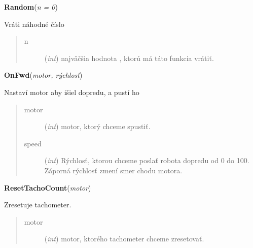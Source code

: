 \documentclass[10pt,a4paper]{article}
\begin{document}
 

\vspace{6pt}
{\bf Random}({\it n = 0}) 
    
    Vráti náhodné číslo
    

    

\begin{quote}
    \begin{description}
        
\item[n] ({\emph{int}}) najväčšia hodnota , ktorú má táto funkcia vrátiť. 

    \end{description}
\end{quote}

 

\vspace{6pt}
{\bf OnFwd}({\it motor, rýchlosť}) 
  
    Nastaví motor aby išiel dopredu, a pustí ho
    


    

\begin{quote}
    \begin{description}
        
\item[motor] ({\emph{int}}) motor, ktorý chceme spustiť.

\item[speed] ({\emph{int}}) Rýchlosť, ktorou chceme poslať robota dopredu od 0 do 100. Záporná rýchlosť zmení smer chodu motora.   

    \end{description}
\end{quote}

 

\vspace{6pt}
{\bf ResetTachoCount}({\it motor}) 
    
    Zresetuje tachometer. 


    

\begin{quote}
    \begin{description}
        
\item[motor] ({\emph{int}}) motor, ktorého tachometer chceme zresetovať.

    \end{description}
\end{quote}

 
\end{document}
